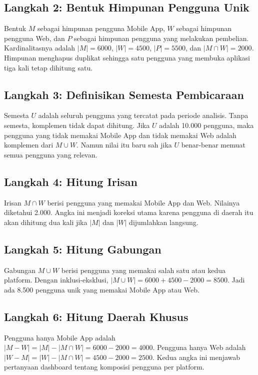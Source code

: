 \documentclass[11pt,a4paper]{article}
\begin{document}
\subsection{Langkah 2: Bentuk Himpunan Pengguna Unik}

Bentuk $M$ sebagai himpunan pengguna Mobile App, $W$ sebagai himpunan pengguna Web, dan $P$ sebagai himpunan pengguna yang melakukan pembelian. Kardinalitasnya adalah $|M|=6000$, $|W|=4500$, $|P|=5500$, dan $|M \cap W|=2000$. Himpunan menghapus duplikat sehingga satu pengguna yang membuka aplikasi tiga kali tetap dihitung satu.

\subsection{Langkah 3: Definisikan Semesta Pembicaraan}

Semesta $U$ adalah seluruh pengguna yang tercatat pada periode analisis. Tanpa semesta, komplemen tidak dapat dihitung. Jika $U$ adalah 10.000 pengguna, maka pengguna yang tidak memakai Mobile App dan tidak memakai Web adalah komplemen dari $M \cup W$. Namun nilai itu baru sah jika $U$ benar-benar memuat semua pengguna yang relevan.

\subsection{Langkah 4: Hitung Irisan}

Irisan $M \cap W$ berisi pengguna yang memakai Mobile App dan Web. Nilainya diketahui 2.000. Angka ini menjadi koreksi utama karena pengguna di daerah itu akan dihitung dua kali jika $|M|$ dan $|W|$ dijumlahkan langsung.

\subsection{Langkah 5: Hitung Gabungan}

Gabungan $M \cup W$ berisi pengguna yang memakai salah satu atau kedua platform. Dengan inklusi-eksklusi, $|M \cup W|=6000+4500-2000=8500$. Jadi ada 8.500 pengguna unik yang memakai Mobile App atau Web.

\subsection{Langkah 6: Hitung Daerah Khusus}

Pengguna hanya Mobile App adalah $|M-W|=|M|-|M \cap W|=6000-2000=4000$. Pengguna hanya Web adalah $|W-M|=|W|-|M \cap W|=4500-2000=2500$. Kedua angka ini menjawab pertanyaan dashboard tentang komposisi pengguna per platform.
\end{document}
